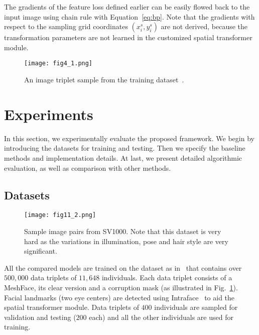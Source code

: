 \documentclass[10pt,twocolumn,letterpaper]{article}
\begin{document}
The gradients of the feature loss defined earlier can be easily flowed back to the input image using chain rule with Equation~\ref{eq:bp}. Note that the gradients with respect to the sampling grid coordinates $(x_i^{s}, y_i^{s})$ are not derived, because the transformation parameters are not learned in the customized spatial transformer module.



\begin{figure}
  \centering
    \texttt{[image: fig4\_1.png]}
    \caption{An image triplet sample from the training dataset~\cite{7550058}.}
    \label{fig:dataset} %
\end{figure}




\section{Experiments}

In this section, we experimentally evaluate the proposed framework. We begin by introducing the datasets for training and testing. Then we specify the baseline methods and implementation details. At last, we present detailed algorithmic evaluation, as well as comparison with other methods.

\subsection{Datasets}

\begin{figure}
  \centering
    \texttt{[image: fig11\_2.png]}
    \caption{Sample image pairs from SV1000. Note that this dataset is very hard as the variations in illumination, pose and hair style are very significant.}
    \label{fig:sv} %
\end{figure}


All the compared models are trained on the dataset as in~\cite{7550058} that contains over $500,000$ data triplets of $11,648$ individuals. Each data triplet consists of a MeshFace, its clear version and a corruption mask (as illustrated in Fig.~\ref{fig:dataset}). Facial landmarks (two eye centers) are detected using Intraface~\cite{XiongD13} to aid the spatial transformer module. Data triplets of $400$ individuals are sampled for validation and testing ($200$ each) and all the other individuals are used for training.
\end{document}
